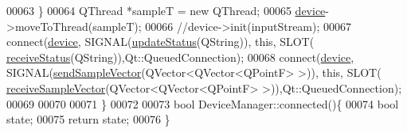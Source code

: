 \begin{DoxyCode}
00063     \}
00064     QThread *sampleT = \textcolor{keyword}{new} QThread;
00065     \hyperlink{classDeviceManager_aa916ac4224ab9a874e6242c0a9f50a56}{device}->moveToThread(sampleT);
00066     \textcolor{comment}{//device->init(inputStream);}
00067     connect(\hyperlink{classDeviceManager_aa916ac4224ab9a874e6242c0a9f50a56}{device}, SIGNAL(\hyperlink{classDeviceManager_a68b6e3b924cacf0a5cde44d02eb49d0c}{updateStatus}(QString)), \textcolor{keyword}{this}, SLOT(
      \hyperlink{classDeviceManager_aa7b96de52a17b961688e81f5e999da74}{receiveStatus}(QString)),Qt::QueuedConnection);
00068     connect(\hyperlink{classDeviceManager_aa916ac4224ab9a874e6242c0a9f50a56}{device}, SIGNAL(\hyperlink{classDeviceManager_a7f0794801ee0b28c74a253f3c2cf5659}{sendSampleVector}(QVector<QVector<QPointF> >)), \textcolor{keyword}{this}, SLOT(
      \hyperlink{classDeviceManager_a14f86d572f6ea7222032ec00499a16a8}{receiveSampleVector}(QVector<QVector<QPointF> >)),Qt::QueuedConnection);
00069 
00070 
00071 \}
00072 
00073 \textcolor{keywordtype}{bool} DeviceManager::connected()\{
00074     \textcolor{keywordtype}{bool} state;
00075     \textcolor{keywordflow}{return} state;
00076 \}
\end{DoxyCode}

